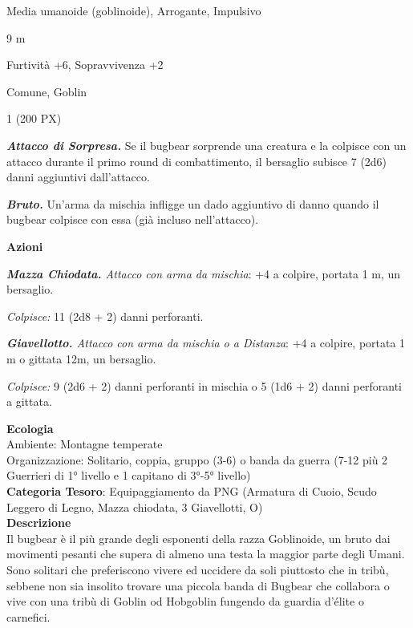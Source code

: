 \begin{multicols}{2}
{
\begin{description}[noitemsep, topsep=0pt, parsep=0pt, partopsep=0pt, itemsep=1pt, leftmargin=2.35cm,  labelwidth=2.2cm, itemindent=0cm, listparindent=0pt] %
\setlength{\baselineskip}{10pt}
\item[\textbf{Taglia/Tipo}] Media umanoide (goblinoide), Arrogante, Impulsivo
\item[\textbf{Caratt.}] 
\item[\textbf{Punti Ferita}] 
\item[\textbf{Movimento}] 9 m
\item[\textbf{Tiri Salvez.}] 
\item[\textbf{Comp.}] Furtività +6, Sopravvivenza +2
\item[\textbf{Sensi}] 
\item[\textbf{Linguaggi}] Comune, Goblin
\item[\textbf{Sfida}] 1 (200 PX)
\end{description}
\smallskip

\emph{\textbf{Attacco di Sorpresa.}} Se il bugbear sorprende una creatura e la colpisce con un attacco durante il primo round di combattimento, il bersaglio subisce 7 (2d6) danni aggiuntivi dall'attacco.

\emph{\textbf{Bruto.}} Un'arma da mischia infligge un dado aggiuntivo di danno quando il bugbear colpisce con essa (già incluso nell'attacco).

\textbf{Azioni}

\emph{\textbf{Mazza Chiodata.} Attacco con arma da mischia}: +4 a colpire, portata 1 m, un bersaglio.

\emph{Colpisce:} 11 (2d8 + 2) danni perforanti.

\emph{\textbf{Giavellotto.} Attacco con arma da mischia o a Distanza}: +4 a colpire, portata 1 m o gittata 12m, un bersaglio.

\emph{Colpisce:} 9 (2d6 + 2) danni perforanti in mischia o 5 (1d6 + 2) danni perforanti a gittata.

\textbf{Ecologia}\\
Ambiente: Montagne temperate\\
Organizzazione: Solitario, coppia, gruppo (3-6) o banda da guerra (7-12 più 2 Guerrieri di 1° livello e 1 capitano di 3°-5° livello)\\
\textbf{Categoria Tesoro}: Equipaggiamento da PNG (Armatura di Cuoio, Scudo Leggero di Legno, Mazza chiodata, 3 Giavellotti, O)\\
\textbf{Descrizione}\\
Il bugbear è il più grande degli esponenti della razza Goblinoide, un bruto dai movimenti pesanti che supera di almeno una testa la maggior parte degli Umani. Sono solitari che preferiscono vivere ed uccidere da soli piuttosto che in tribù, sebbene non sia insolito trovare una piccola banda di Bugbear che collabora o vive con una tribù di Goblin od Hobgoblin fungendo da guardia d'élite o carnefici.

}
\end{multicols}
